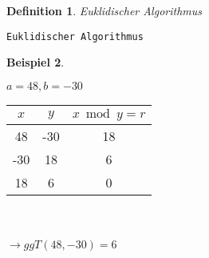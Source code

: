 \documentclass[a4paper,11pt]{article}
\newtheorem{definition}{Definition}[section]
\newtheorem{bsp}[definition]{Beispiel}
\begin{document}
\newpage

\begin{definition}
	Euklidischer Algorithmus
\end{definition}
\begin{algorithm}[!h]
	\caption{\texttt{Euklidischer Algorithmus}}
\end{algorithm}

\begin{bsp}
\end{bsp}
$a=48,b=-30$ \\
\begin{tabular}{c|c|c}
	$x$ & $y$ & $x\bmod y=r$ \\
	\hline
	48 & -30 & 18 \\
	-30 & 18 & 6 \\
	18 & 6 & 0
\end{tabular} \\
\\
$\rightarrow ggT(48,-30)=6$

\newpage
\end{document}

